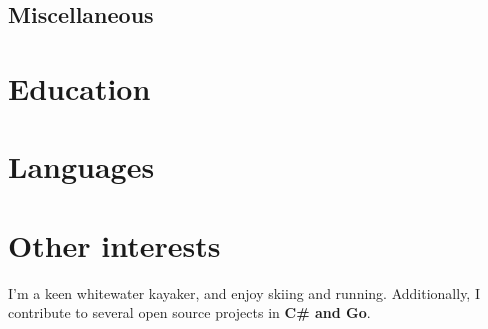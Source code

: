\documentclass[11pt,a4paper,sans]{moderncv}        %
\begin{document}
\subsection{Miscellaneous}

\section{Education}

\section{Languages}


\section{Other interests}
I'm a keen whitewater kayaker, and enjoy skiing and running. Additionally, I contribute to several open source projects in \textbf{C\# and Go}.

\clearpage
\end{document}
